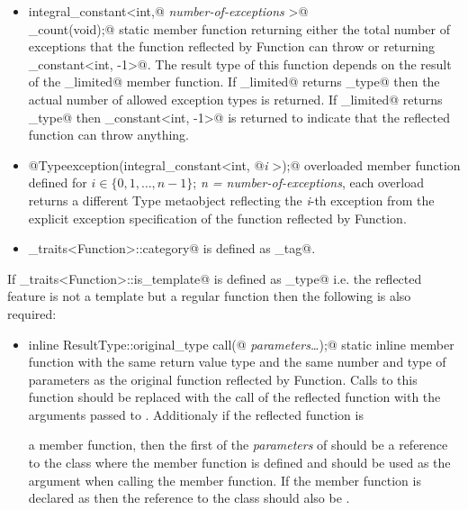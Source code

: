 \begin{itemize}
	\item{\verb@static integral_constant<int,@ {\em number-of-exceptions}
	\verb@>@\\\verb@exception_count(void);@} static member function returning either the total number
	of exceptions that the function reflected by {\metaobject Function} can throw or returning
	\verb@integral_constant<int, -1>@. The result type of this function depends on the result
	of the \verb@throw_limited@ member function. If \verb@throw_limited@ returns \verb@true_type@
	then the actual number of allowed exception types is returned. If \verb@throw_limited@ returns
	\verb@false_type@ then \verb@integral_constant<int, -1>@ is returned to indicate that
	the reflected function can throw anything.

	\item{\verb@static @{\metaobject Type}\verb@ exception(integral_constant<int, @{\em i}
	\verb@>);@} overloaded member function defined
	for $i \in \{0, 1, \dots, n-1\}$; {\em n = number-of-exceptions},
	each overload returns a different {\metaobject Type} metaobject reflecting the {\em i}-th exception
	from the explicit exception specification of the function reflected by {\metaobject Function}.

	\item \verb@metaobject_traits<Function>::category@ is defined as \verb@function_tag@.
\end{itemize}

If \verb@metaobject_traits<Function>::is_template@ is defined as \verb@false_type@
i.e. the reflected feature is not a template but a regular function then the following is also
required:

\begin{itemize}
	\item{\verb@static inline ResultType::original_type call(@ {\em parameters\dots}\verb@);@}
	static inline member function with the same return value type and the same number
	and type of parameters as the original function reflected by {\metaobject Function}.
	Calls to this function should be replaced with the call of the reflected function
	with the arguments passed to \verb@call@. Additionaly if the reflected function is

	a member function, then the first of the {\em parameters} of \verb@call@ should be
	a reference to the class where the member function is defined and should be used
	as the \verb@this@ argument when calling the member function. If the member function
	is declared as \verb@const@ then the reference to the class should also be \verb@const@.
\end{itemize}

